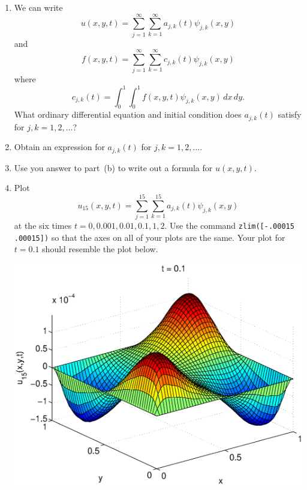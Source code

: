 \begin{enumerate}
\item We can write
\[
u(x,y,t) = \sum_{j=1}^\infty \sum_{k=1}^\infty a_{j,k}(t) \psi_{j,k} (x,y)
\]
and
\[
f(x,y,t) = \sum_{j=1}^\infty \sum_{k=1}^\infty c_{j,k}(t) \psi_{j,k} (x,y)
\]
where
\[
c_{j,k}(t) = \int_0^1 \int_0^1 f(x,y,t) \psi_{j,k} (x,y)\,dx\,dy.
\]
What ordinary differential equation and initial condition does $a_{j,k}(t)$ satisfy for $j,k = 1,2,\ldots$?
\\
\item Obtain an expression for $a_{j,k}(t)$ for $j,k=1,2,\ldots$.
\\
\item Use you answer to part~(b) to write out a formula for $u(x,y,t)$.
\\
\item Plot
\[
u_{15}(x,y,t) = \sum_{j=1}^{15} \sum_{k=1}^{15}a_{j,k}(t)\psi_{j,k}(x,y)
\]
at the six times $t=0, 0.001, 0.01, 0.1, 1, 2$. Use the command \verb|zlim([-.00015 .00015])| so that the axes on all of your plots are the same. Your plot for $t=0.1$ should resemble the plot below.

\begin{center}\includegraphics[scale=0.6]{heat2d4} \end{center}

\end{enumerate}




